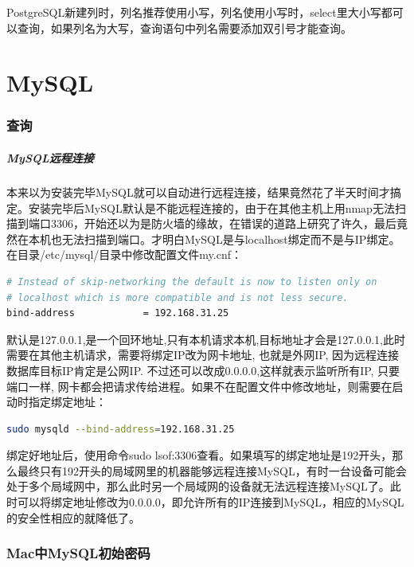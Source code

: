 \documentclass[letter]{book}
\begin{document}
PostgreSQL新建列时，列名推荐使用小写，列名使用小写时，select里大小写都可以查询，如果列名为大写，查询语句中列名需要添加双引号才能查询。

\chapter{MySQL}

\subsection{查询}

\paragraph{MySQL远程连接}

本来以为安装完毕MySQL就可以自动进行远程连接，结果竟然花了半天时间才搞定。安装完毕后MySQL默认是不能远程连接的，由于在其他主机上用nmap无法扫描到端口3306，开始还以为是防火墙的缘故，在错误的道路上研究了许久，最后竟然在本机也无法扫描到端口。才明白MySQL是与localhost绑定而不是与IP绑定。在目录/etc/mysql/目录中修改配置文件my.cnf：

\begin{lstlisting}[language=Bash]
# Instead of skip-networking the default is now to listen only on
# localhost which is more compatible and is not less secure.
bind-address            = 192.168.31.25
\end{lstlisting}

默认是127.0.0.1,是一个回环地址,只有本机请求本机,目标地址才会是127.0.0.1,此时需要在其他主机请求，需要将绑定IP改为网卡地址, 也就是外网IP, 因为远程连接数据库目标IP肯定是公网IP. 不过还可以改成0.0.0.0,这样就表示监听所有IP, 只要端口一样, 网卡都会把请求传给进程。如果不在配置文件中修改地址，则需要在启动时指定绑定地址：

\begin{lstlisting}[language=Bash]
sudo mysqld --bind-address=192.168.31.25
\end{lstlisting}

绑定好地址后，使用命令sudo lsof:3306查看。如果填写的绑定地址是192开头，那么最终只有192开头的局域网里的机器能够远程连接MySQL，有时一台设备可能会处于多个局域网中，那么此时另一个局域网的设备就无法远程连接MySQL了。此时可以将绑定地址修改为0.0.0.0，即允许所有的IP连接到MySQL，相应的MySQL的安全性相应的就降低了。

\subsection{Mac中MySQL初始密码}
\end{document}
